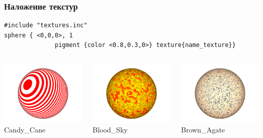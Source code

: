 \documentclass{beamer}
\begin{document}
\begin{frame}[fragile]
\frametitle{Наложение текстур}
\begin{verbatim}
#include "textures.inc"
sphere { <0,0,0>, 1 
			  pigment {color <0.8,0.3,0>} texture{name_texture}}
\end{verbatim}
\begin{columns}
	\begin{column}{4cm}	
		\includegraphics[width=4 cm]{moon_candy.png}
		\center
		\\Candy\_Cane
	\end{column}
	\begin{column}{4cm}	
		\includegraphics[width=4 cm]{moon_Blood_Sky.png}
		\center
		\\Blood\_Sky
	\end{column}
	\begin{column}{4cm}	
		\includegraphics[width=4 cm]{moon_Brown_Agate.png}
		\center
		\\Brown\_Agate
	\end{column}
\end{columns}
\end{frame}

{
}
\end{document}

